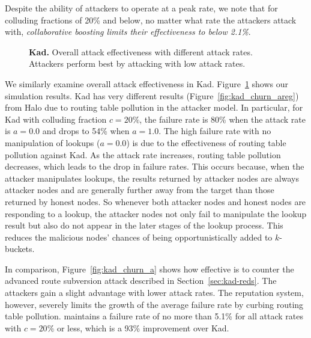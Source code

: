 Despite the ability of attackers to operate at a peak rate, we note that
for colluding fractions of 20\% and below, no matter what rate the
attackers attack with, \emph{collaborative boosting limits their
  effectiveness to below 2.1\%}.









\begin{figure}[t!]
\centering
\caption{{\bf Kad.} Overall attack effectiveness with different attack
   rates. Attackers perform best by attacking with low attack rates. }
\label{fig:kad_churn_ar_graphs}
\end{figure}

 We similarly examine overall attack effectiveness in
Kad. Figure~\ref{fig:kad_churn_ar_graphs} shows our simulation
results. Kad has very different results
(Figure~\ref{fig:kad_churn_areg}) from Halo due to routing table
pollution in the attacker model.
In particular, for Kad with colluding fraction $c=20\%$, the failure
rate is 80\% when the attack rate is $a=0.0$ and drops to 54\% when
$a=1.0$. The high failure rate with no manipulation of lookups ($a=0.0$)
is due to the effectiveness of routing table pollution against Kad. As
the attack rate increases, routing table pollution decreases, which
leads to the drop in failure rates.
This occurs because, when the attacker manipulates lookups, the results
returned by attacker nodes are always attacker nodes and are generally
further away from the target than those returned by honest nodes. So
whenever both attacker nodes and honest nodes are responding to a
lookup, the attacker nodes not only fail to manipulate the lookup result
but also do not appear in the later stages of the lookup process. This
reduces the malicious nodes' chances of being opportunistically added to
$k$-buckets.

In comparison, Figure~\ref{fig:kad_churn_a} shows how effective \ksys is
to counter the advanced route subversion attack described in
Section~\ref{sec:kad-reds}. The attackers gain a slight advantage with
lower attack rates. The reputation system, however, severely limits the
growth of the average failure rate by curbing routing table
pollution. \ksys maintains a failure rate of no more than 5.1\% for all
attack rates with $c=20\%$ or less, which is a 93\% improvement over
Kad.






